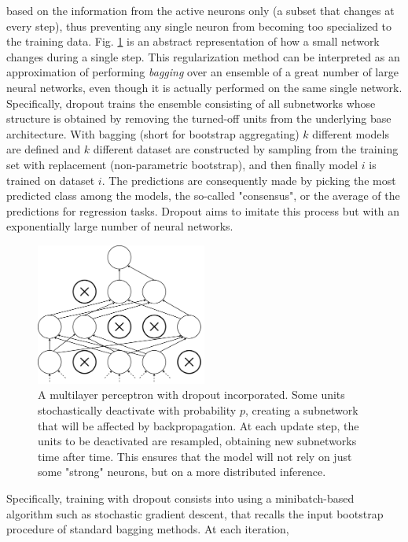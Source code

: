 \documentclass[binding=0.7cm, oneside]{sapthesis}
\begin{document}
based on the information from the active neurons only (a subset that changes at every step), thus preventing any single neuron from becoming too specialized to the training data.
Fig. \ref{fig:dropout} is an abstract representation of how a small network changes during a single step.
This regularization method can be interpreted as an approximation of performing \emph{bagging} over an ensemble of a great number of large neural networks, even though it is actually performed
on the same single network. Specifically, dropout trains the ensemble consisting of all subnetworks whose structure is obtained by removing the turned-off units from the underlying base architecture.
With bagging (short for bootstrap aggregating) $k$ different models are defined and $k$ different dataset are constructed by sampling from the training set with replacement (non-parametric bootstrap), and then finally
model $i$ is trained on dataset $i$. The predictions are consequently made by picking the most predicted class among the models, the so-called "consensus", or the average of the predictions for regression tasks.
Dropout aims to imitate this process but with an exponentially large number of neural networks.
\begin{figure}[h]
    \centering
    \includegraphics[width=0.5\textwidth]{images/dropout.png}
    \caption{A multilayer perceptron with dropout incorporated. Some units stochastically deactivate with probability $p$, creating a subnetwork that will be affected by backpropagation.
        At each update step, the units to be deactivated are resampled, obtaining new subnetworks time after time. This ensures that the model will not rely on just some "strong" neurons, but on a more
        distributed inference.}
    \label{fig:dropout}
\end{figure}
Specifically, training with dropout consists into using a minibatch-based algorithm such as stochastic gradient descent, that recalls the input bootstrap procedure of standard bagging methods. At each iteration,
\end{document}
